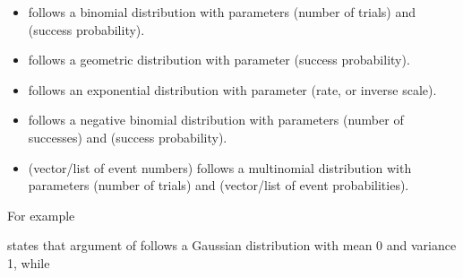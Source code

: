 \documentclass[letterpaper,10pt,english]{sphinxmanual}
\begin{document}
\begin{itemize}
\item {} 
\sphinxAtStartPar
{}  follows a binomial distribution with parameters  (number of trials) and  (success probability).

\item {} 
\sphinxAtStartPar
{}  follows a geometric distribution with parameter  (success probability).

\item {} 
\sphinxAtStartPar
{}  follows an exponential distribution with parameter  (rate, or inverse scale).

\item {} 
\sphinxAtStartPar
{}  follows a negative binomial distribution with parameters  (number of successes) and  (success probability).

\item {} 
\sphinxAtStartPar
{}  (vector/list of event numbers) follows a multinomial distribution with parameters  (number of trials) and  (vector/list of event probabilities).

\end{itemize}

\sphinxAtStartPar
For example

\begin{sphinxVerbatim}[commandchars=\\\{\}]
  
\end{sphinxVerbatim}

\sphinxAtStartPar
states that argument  of  follows a Gaussian distribution with mean 0 and variance 1, while

\begin{sphinxVerbatim}[commandchars=\\\{\}]
 \PYG{p}{[}\PYG{p}{]} \PYG{p}{[}\PYG{p}{[}\PYG{p}{]}\PYG{p}{[}\PYG{p}{]}\PYG{p}{]}
\end{sphinxVerbatim}
\end{document}

